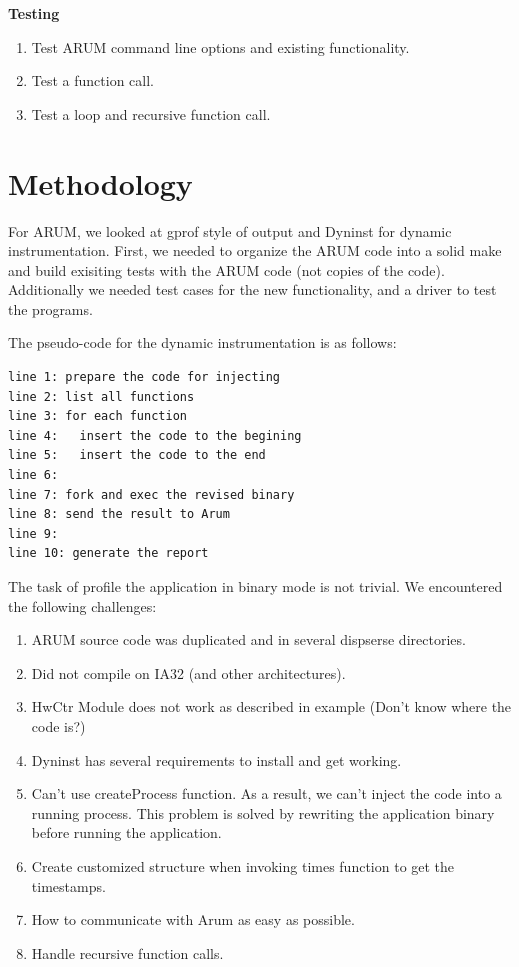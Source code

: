 \documentclass[11pt,letterpaper,oneside]{article}
\begin{document}
\textbf{Testing}
\begin{enumerate}
\item Test ARUM command line options and existing functionality.
\item Test a function call.
\item Test a loop and recursive function call.
\end{enumerate}

\section{Methodology}
For ARUM, we looked at gprof style of output and Dyninst for dynamic instrumentation.  First, we needed to organize the ARUM code into a solid make and build exisiting tests with the ARUM code (not copies of the code).   Additionally we needed test cases for the new functionality, and a driver to test the programs.

The pseudo-code for the dynamic instrumentation is as follows:
\begin{Verbatim}[frame=single]
line 1: prepare the code for injecting
line 2: list all functions
line 3: for each function
line 4:   insert the code to the begining
line 5:   insert the code to the end
line 6:
line 7: fork and exec the revised binary
line 8: send the result to Arum
line 9: 
line 10: generate the report
\end{Verbatim}

The task of profile the application in binary mode is not trivial. We encountered the following challenges:
\begin{enumerate}
\item ARUM source code was duplicated and in several dispserse directories.  
\item Did not compile on IA32 (and other architectures).
\item HwCtr Module does not work as described in example (Don't know where the code is?)
\item Dyninst has several requirements to install and get working.
\item Can't use createProcess function. As a result, we can't inject the code into a running process. This problem is solved by rewriting the application binary before running the application.
\item Create customized structure when invoking times function to get the timestamps.
\item How to communicate with Arum as easy as possible.
\item Handle recursive function calls.
\end{enumerate}
\end{document}
